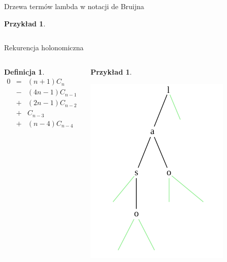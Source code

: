 \documentclass[final]{beamer}
\theoremstyle{bluetheorem}
\theoremstyle{bluetheorem}
\newtheorem{mydefinition}[mytheorem]{Definicja}
\theoremstyle{greentheorem}
\newtheorem{myexample}[mytheorem]{Przykład}
\begin{document}
\begin{frame}{Drzewa termów lambda w notacji de Bruijna}
\begin{myexample}
\begin{columns}
\begin{center}
            \end{center}
        \end{columns}
    \end{myexample}
\end{frame}

\begin{frame}{Rekurencja holonomiczna}
    \begin{columns}
        \begin{mydefinition}
            \[\begin{array}{rcl}
                         0 &=& (n + 1)C_n\\
                           &-& (4n - 1)C_{n-1}\\
                           &+& (2n - 1)C_{n-2}\\
                           &+& C_{n-3}\\
                           &+& (n - 4)C_{n-4}
            \end{array}\]
        \end{mydefinition}

        \begin{myexample}
            \begin{center}
                \includegraphics[width=.8\textwidth]{example.png}
            \end{center}
        \end{myexample}
    \end{columns}
\end{frame}
\end{document}

